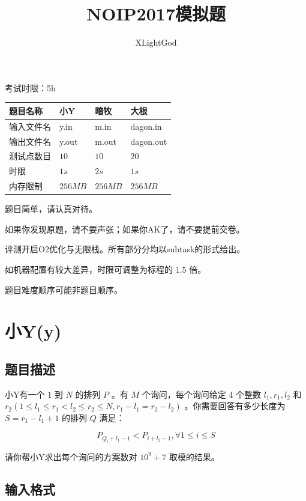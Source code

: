 \documentclass[12pt]{article}
\begin{document}
\title{NOIP2017模拟题}
\author{XLightGod}
\maketitle
\begin{center}

考试时限：5h

\begin{tabular}{|l|p{100pt}|p{100pt}|p{100pt}|}
    \hline
    题目名称&小Y&暗牧&大根\\ \hline
    输入文件名&y.in&m.in&dagon.in\\ \hline
    输出文件名&y.out&m.out&dagon.out\\ \hline
    测试点数目&$10$&$10$&$20$\\ \hline
    时限&$1s$&$2s$&$1s$\\ \hline
    内存限制&$256MB$&$256MB$&$256MB$\\ \hline
\end{tabular}
\end{center}

题目简单，请认真对待。

如果你发现原题，请不要声张；如果你AK了，请不要提前交卷。

评测开启O2优化与无限栈。所有部分分均以subtask的形式给出。

如机器配置有较大差异，时限可调整为标程的 $1.5$ 倍。

题目难度顺序可能非题目顺序。

\newpage

\section{小Y(y)}
\subsection{题目描述}

小Y有一个 $1$ 到 $N$ 的排列 $P$ 。有 $M$ 个询问，每个询问给定 $4$ 个整数 $l_1,r_1,l_2$ 和$r_2(1\le l_1\le r_1<l_2\le r_2\le N,r_1-l_1=r_2-l_2)$ 。你需要回答有多少长度为 $S=r_1−l_1+1$ 的排列 $Q$ 满足：

$$P_{Q_i+l_1−1}<P_{i+l_2−1},\forall 1\le i\le S$$

请你帮小Y求出每个询问的方案数对 $10^9+7$ 取模的结果。

\subsection{输入格式}
\end{document}
